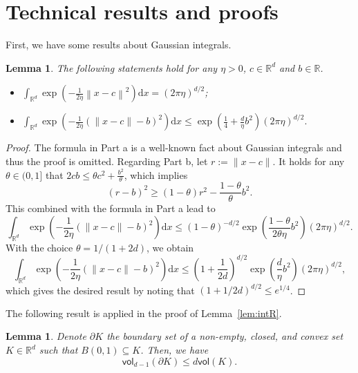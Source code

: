 \documentclass[11pt,letterpaper]{article}
\newcommand{\R}{\mathbb{R}}
\newcommand{\norm}[1]{\left\lVert #1 \right\rVert}
\newcommand{\D}{\mathrm{d}}
\newcommand{\vol}{\mathsf{vol}}
\newcommand{\brac}[1]{\left( #1\right)}
\newtheorem{lemma}[thm]{Lemma}
\begin{document}
\section{Technical results and proofs}\label{appendix:techlem}


First, we have some results about Gaussian integrals. 
\begin{lemma}\label{lem:gaussianint}
The following statements hold for any $\eta>0$, $c\in \R^d$ and $b\in \R$.
\begin{itemize}
    \item[(a)] $ \int_{\R^d} \exp\brac{-\frac{1}{2\eta} \norm{x-c}^2} \D x=(2\pi \eta)^{d/2}$;

    \item[(b)] $ \int_{\R^d} \exp\left(-\frac{1}{2\eta}(\|x-c\|-b)^2\right) \D x
    \le \exp \left(\frac14 + \frac{d}{\eta}b^2\right)(2\pi\eta)^{d/2}.$

\end{itemize} 
\end{lemma}


\begin{proof}
 The formula in Part a is a well-known fact about Gaussian integrals and thus the proof is omitted. Regarding Part b, let  $r:=\|x-c\|$. It holds for any $\theta\in(0,1]$ that $2cb\le \theta c^2+\frac{b^2}{\theta}$, which implies
\[
(r-b)^2 \ge (1-\theta)r^2 - \frac{1-\theta}{\theta}b^2.
\]
This combined with the formula in Part a lead to 
\[
\int_{\R^d} \exp\left(-\frac{1}{2\eta}(\|x-c\|-b)^2\right) \D x
\le (1-\theta)^{-d/2}\exp \left(\frac{1-\theta}{2\theta \eta}b^2\right)(2\pi\eta)^{d/2}. 
\]
With the choice $\theta = 1/(1+2d)$, we obtain
\[
\int_{\R^d} \exp\left(-\frac{1}{2\eta}(\|x-c\|-b)^2\right) \D x \le \left(1+\frac{1}{2d}\right)^{d/2}\exp \left(\frac{d}{\eta}b^2\right)(2\pi\eta)^{d/2},
\]
which gives the desired result by noting that $(1+1/2d)^{d/2} \le e^{1/4}$.
\end{proof}



The following result is applied in the proof of Lemma~\ref{lem:intR}. 
\begin{lemma} \label{lem:vol}
Denote $\partial K$ the boundary set of a non-empty, closed, and convex set $K \in \R^d$ such that $B(0,1) \subseteq K$. Then, we have
    \begin{equation} \label{ineq:vol}
		\vol_{d-1}(\partial K) \le d \vol(K).
	\end{equation}
\end{lemma}
\end{document}
